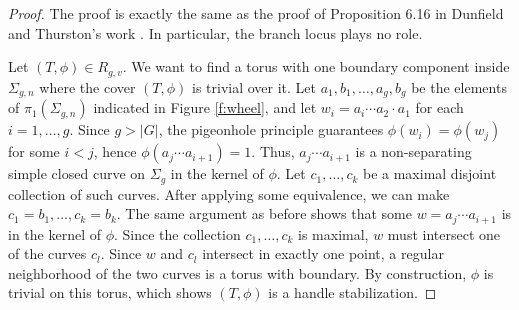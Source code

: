 \documentclass[10pt,twocolumn,amsmath,amssymb,aps,pra,secnumarabic,
    nofootinbib,groupedaddress]{revtex4-1}
\begin{document}
\begin{proof}
The proof is exactly the same as the proof of Proposition 6.16 in Dunfield and Thurston's work \cite{DunfieldThurston:random}.  In particular, the branch locus plays no role.

Let $(T,\phi) \in R_{g,v}$.  We want to find a torus with one boundary component inside $\Sigma_{g,n}$ where the cover $(T,\phi)$ is trivial over it.  Let $a_1,b_1,\dots,a_g,b_g$ be the elements of $\pi_1(\Sigma_{g,n})$ indicated in Figure \ref{f:wheel}, and let $w_i = a_i \cdots a_2 \cdot a_1$ for each $i=1,\dots,g$.  Since $g>|G|$, the pigeonhole principle guarantees $\phi(w_i) = \phi(w_j)$ for some $i<j$, hence $\phi(a_j\cdots a_{i+1}) = 1$.  Thus, $a_j\cdots a_{i+1}$ is a non-separating simple closed curve on $\Sigma_g$ in the kernel of $\phi$.  Let $c_1,\dots,c_k$ be a maximal disjoint collection of such curves.  After applying some equivalence, we can make $c_1=b_1,\dots,c_k=b_k$.  The same argument as before shows that some $w=a_j\cdots a_{i+1}$ is in the kernel of $\phi$.  Since the collection $c_1,\dots,c_k$ is maximal, $w$ must intersect one of the curves $c_l$.  Since $w$ and $c_l$ intersect in exactly one point, a regular neighborhood of the two curves is a torus with boundary.  By construction, $\phi$ is trivial on this torus, which shows $(T,\phi)$ is a handle stabilization.
\end{proof}
\end{document}
